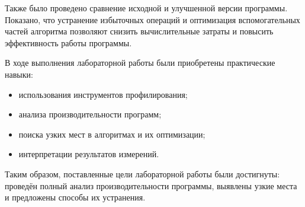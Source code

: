 \documentclass[12pt]{article}
\begin{document}
Также было проведено сравнение исходной и улучшенной версии программы. Показано, что устранение избыточных операций и оптимизация вспомогательных частей алгоритма позволяют снизить вычислительные затраты и повысить эффективность работы программы.

В ходе выполнения лабораторной работы были приобретены практические навыки:
\begin{itemize}
	\item использования инструментов профилирования;
	\item анализа производительности программ;
	\item поиска узких мест в алгоритмах и их оптимизации;
	\item интерпретации результатов измерений.
\end{itemize}

Таким образом, поставленные цели лабораторной работы были достигнуты: проведён полный анализ производительности программы, выявлены узкие места и предложены способы их устранения.
\end{document}
